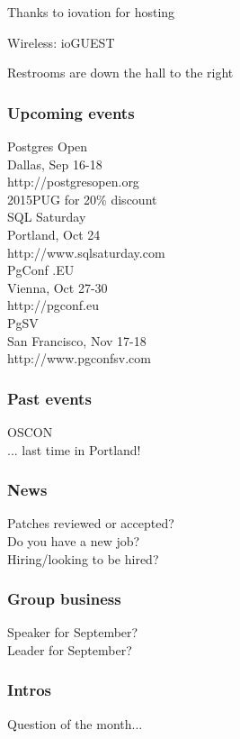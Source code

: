 \documentclass{beamer}
\begin{document}

\frame
{
  \begin{center}
  \item[]Thanks to iovation for hosting
  \item[]Wireless: ioGUEST
  \item[]Restrooms are down the hall to the right
  \end{center}
}

\frame
{
  \frametitle{Upcoming events}
  \begin{center}
{\large Postgres Open\\}
Dallas, Sep 16-18\\
http://postgresopen.org\\
{\tiny 2015PUG for 20\% discount}\\
\vspace{5 mm}
{\large SQL Saturday\\}
Portland, Oct 24\\
http://www.sqlsaturday.com\\
\vspace{5 mm}
{\large PgConf
.EU\\}
Vienna, Oct 27-30\\
http://pgconf.eu\\
\vspace{5 mm}
{\large PgSV\\}
San Francisco, Nov 17-18\\
http://www.pgconfsv.com\\
  \end{center}
}

\frame
{
  \frametitle{Past events}
  \begin{center}
{\large OSCON\\}
... last time in Portland!\\
\vspace{5 mm}
  \end{center}
}

\frame
{
  \frametitle{News}
  \begin{center}
Patches reviewed or accepted?\\
Do you have a new job?\\
Hiring/looking to be hired?\\
  \end{center}
}

\frame
{
  \frametitle{Group business}
  \begin{center}
Speaker for September?\\
Leader for September?\\
  \end{center}
}

\frame
{
  \frametitle{Intros}
  \begin{center}
Question of the month...\\
  \end{center}
}
\end{document}
